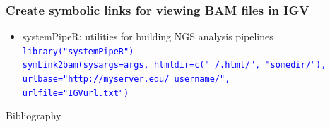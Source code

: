 \documentclass{beamer}
\begin{document}
\begin{frame}
	\frametitle{Create symbolic links for viewing BAM files in IGV}
\begin{itemize}
	\item systemPipeR: utilities for building NGS analysis pipelines \href{https://github.com/tgirke/systemPipeR}{{}} \\
	\vspace{0.3cm}
	\scriptsize
	\hspace{0.5cm} \textcolor{blue}{\texttt{library("systemPipeR")}} \\
	\hspace{0.5cm} \textcolor{blue}{\texttt{symLink2bam(sysargs=args, htmldir=c("~/.html/", "somedir/"), }} \\ 
	\hspace{1.5cm} \textcolor{blue}{\texttt{urlbase="http://myserver.edu/~username/", }} \\
	\hspace{1.5cm} \textcolor{blue}{\texttt{urlfile="IGVurl.txt")}}
\end{itemize}
\end{frame}
\def\newblock{\hskip .11em plus .33em minus .07em} %
\begin{frame}[allowframebreaks]{Bibliography}
\scriptsize
\end{frame}
\end{document}

